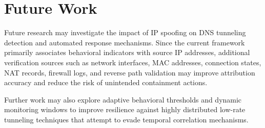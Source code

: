 \documentclass[14pt, a4paper, oneside]{report}
\begin{document}
\section{Future Work}

Future research may investigate the impact of IP spoofing on DNS tunneling detection and automated response mechanisms. Since the current framework primarily associates behavioral indicators with source IP addresses, additional verification sources such as network interfaces, MAC addresses, connection states, NAT records, firewall logs, and reverse path validation may improve attribution accuracy and reduce the risk of unintended containment actions.

Further work may also explore adaptive behavioral thresholds and dynamic monitoring windows to improve resilience against highly distributed low-rate tunneling techniques that attempt to evade temporal correlation mechanisms.

\renewcommand{\bibname}{REFERENCES}
\end{document}

